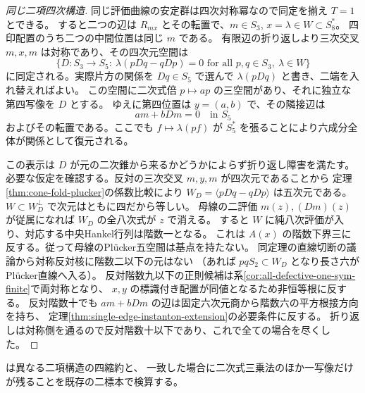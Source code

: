 \begin{proof}[同じ二項四次構造]
同じ評価曲線の安定群は四次対称冪なので同定を揃え $T=1$ とできる。
すると二つの辺は $R_{mx}$ とその転置で、$m\in S_3$, $x=\lambda\in W\subset S_8^*$。
四印配置のうち二つの中間位置は同じ $m$ である。
有限辺の折り返しより三次交叉 $m,x,m$ は対称であり、その四次元空間は
\[
  \{D:S_3\longrightarrow S_5:\ 
      \lambda(pDq-qDp)=0\text{ for all }p,q\in S_3,\ \lambda\in W\}
\]
に同定される。実際片方の関係を $Dq\in S_5$ で選んで
$\lambda(p Dq)$ と書き、二端を入れ替えればよい。
この空間に二次式倍 $p\mapsto a p$ の三空間があり、それに独立な第四写像を $D$ とする。
ゆえに第四位置は $y=(a,b)$ で、その隣接辺は
\[
                       a m+bDm=0\quad\text{in }S_5
\]
およびその転置である。ここでも
$f\mapsto\lambda(p f)$ が $S_5^*$ を張ることにより六成分全体が関係として復元される。

この表示は $D$ が元の二次錐から来るかどうかによらず折り返し障害を満たす。
必要な仮定を確認する。反対の三次交叉 $m,y,m$ が四次元であることから
定理\ref{thm:cone-fold-plucker}の係数比較により
$W_D=\langle pDq-qDp\rangle$ は五次元である。$W\subset W_D^\perp$ で次元はともに四だから等しい。
母線の二評価 $m(z),(Dm)(z)$ が従属になれば $W_D$ の全八次式が $z$ で消える。
すると $W$ に純八次評価が入り、対応する中央Hankel行列は階数一となる。
これは $A(x)$ の階数下界三に反する。従って母線のPlücker五空間は基点を持たない。
同定理の直線切断の議論から対称反対核に階数二以下の元はない
（あれば $pqS_2\subset W_D$ となり長さ六がPlücker直線へ入る）。
反対階数九以下の正則候補は系\ref{cor:all-defective-one-sym-finite}で両対称となり、
$x,y$ の標識付き配置が同値となるため非恒等根に反する。
反対階数十でも $a m+bDm$ の辺は固定六次元商から階数六の平方根接方向を持ち、
定理\ref{thm:single-edge-instanton-extension}の必要条件に反する。
折り返しは対称側を通るので反対階数十以下であり、これで全ての場合を尽くした。
\end{proof}
 は異なる二項構造の四縮約と、
一致した場合に二次式三乗法のほか一写像だけが残ることを既存の二標本で検算する。
